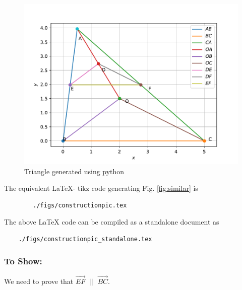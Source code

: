 \begin{enumerate}
    \begin{figure}[!ht]
	\centering
	\includegraphics[width=\columnwidth]{./figs/similartrianglefig.pdf}
	\caption{Triangle generated using python}
	\label{fig:triabcpy}
    \end{figure}
      The equivalent \LaTeX{}- tikz code generating Fig. \ref{fig:similar} is
    \begin{lstlisting}
        ./figs/constructionpic.tex
    \end{lstlisting}
	
	The above \LaTeX{} code can be compiled as a standalone document as
	\begin{lstlisting}
	./figs/constructionpic_standalone.tex
	\end{lstlisting}
\end{enumerate}
\subsubsection*{To Show:}    We need to prove that $\vec{EF}$ $\parallel$   $\vec{BC}$.\\

